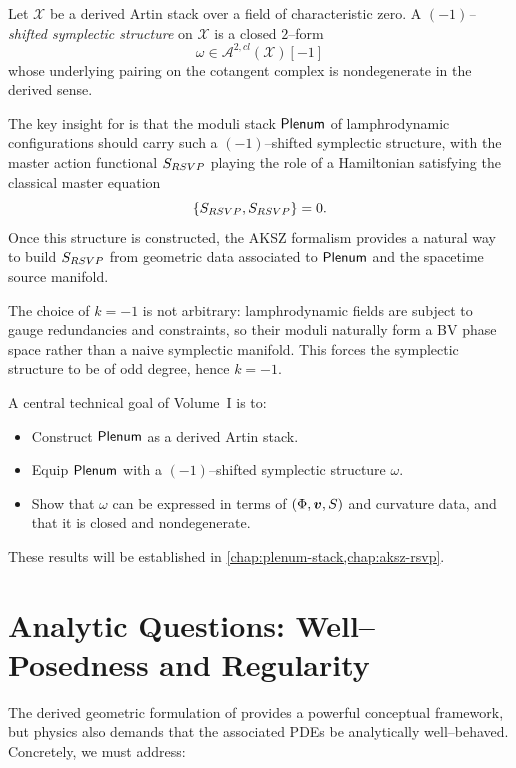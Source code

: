 \begin{definition}
Let $\mathcal{X}$ be a derived Artin stack over a field of characteristic
zero. A \emph{$(-1)$--shifted symplectic structure} on $\mathcal{X}$ is a
closed $2$--form
\[
  \omega \in \mathcal{A}^{2,cl}(\mathcal{X})[-1]
\]
whose underlying pairing on the cotangent complex is nondegenerate in the
derived sense.
\end{definition}

The key insight for \rsvpabbr{} is that the moduli stack $\mathsf{Plenum}$ of
lamphrodynamic configurations should carry such a $(-1)$--shifted symplectic
structure, with the master action functional $S_{RSVP}$ playing the role
of a Hamiltonian satisfying the classical master equation
\[
  \{S_{RSVP},S_{RSVP}\} = 0.
\]
Once this structure is constructed, the AKSZ formalism provides a natural way
to build $S_{RSVP}$ from geometric data associated to $\mathsf{Plenum}$ and the
spacetime source manifold.

\Intuition
The choice of $k=-1$ is not arbitrary: lamphrodynamic fields are subject to
gauge redundancies and constraints, so their moduli naturally form a BV phase
space rather than a naive symplectic manifold. This forces the symplectic
structure to be of odd degree, hence $k=-1$.

A central technical goal of Volume~I is to:
\begin{itemize}
  \item Construct $\mathsf{Plenum}$ as a derived Artin stack.
  \item Equip $\mathsf{Plenum}$ with a $(-1)$--shifted symplectic structure $\omega$.
  \item Show that $\omega$ can be expressed in terms of $(\Phi,\bm{v},S)$
  and curvature data, and that it is closed and nondegenerate.
\end{itemize}
These results will be established in \cref{chap:plenum-stack,chap:aksz-rsvp}.

\section{Analytic Questions: Well–Posedness and Regularity}

The derived geometric formulation of \rsvpabbr{} provides a powerful conceptual
framework, but physics also demands that the associated PDEs be analytically
well--behaved. Concretely, we must address:

